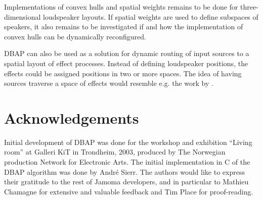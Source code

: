 \documentclass[twoside,10pt]{article}
\begin{document}
Implementations of convex hulls and spatial weights remains to be done for three-dimensional loudspeaker layouts. If spatial weights are used to define subspaces of speakers, it also remains to be investigated if and how the implementation of convex hulls can be dynamically reconfigured.


DBAP can also be used as a solution for dynamic routing of input sources to a spatial layout of effect processes. Instead of defining loudspeaker positions, the effects could be assigned positions in two or more spaces. The idea of having sources traverse a space of effects would resemble  e.g. the work by \cite{Momeni:2003hipnoscope}. 


\section{Acknowledgements}

Initial development of DBAP was done for the workshop and exhibition ``Living room'' at Galleri KiT in Trondheim, 2003, produced by The Norwegian production Network for Electronic Arts. The initial implementation in C of the DBAP algorithm was done by Andr\'e Sierr. The authors would like to express their gratitude to the rest of Jamoma developers, and in particular to Mathieu Chamagne for extensive and valuable feedback and Tim Place for proof-reading. 




\end{document}
